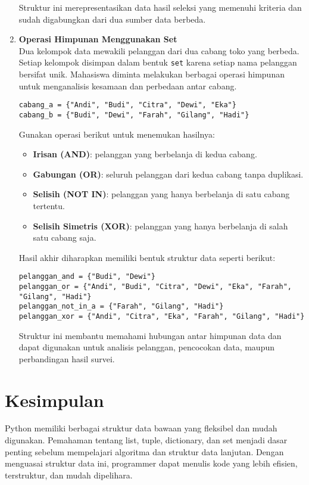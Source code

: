 \begin{enumerate}
Struktur ini merepresentasikan data hasil seleksi yang memenuhi kriteria dan sudah digabungkan dari dua sumber data berbeda.


\item \textbf{Operasi Himpunan Menggunakan Set} \\
Dua kelompok data mewakili pelanggan dari dua cabang toko yang berbeda. 
Setiap kelompok disimpan dalam bentuk \texttt{set} karena setiap nama pelanggan bersifat unik.  
Mahasiswa diminta melakukan berbagai operasi himpunan untuk menganalisis kesamaan dan perbedaan antar cabang.

\begin{lstlisting}[style=PythonStyle]
cabang_a = {"Andi", "Budi", "Citra", "Dewi", "Eka"}
cabang_b = {"Budi", "Dewi", "Farah", "Gilang", "Hadi"}
\end{lstlisting}

Gunakan operasi berikut untuk menemukan hasilnya:
\begin{itemize}
  \item \textbf{Irisan (AND)}: pelanggan yang berbelanja di kedua cabang.
  \item \textbf{Gabungan (OR)}: seluruh pelanggan dari kedua cabang tanpa duplikasi.
  \item \textbf{Selisih (NOT IN)}: pelanggan yang hanya berbelanja di satu cabang tertentu.
  \item \textbf{Selisih Simetris (XOR)}: pelanggan yang hanya berbelanja di salah satu cabang saja.
\end{itemize}

Hasil akhir diharapkan memiliki bentuk struktur data seperti berikut:

\begin{lstlisting}[style=PythonStyle]
pelanggan_and = {"Budi", "Dewi"}
pelanggan_or = {"Andi", "Budi", "Citra", "Dewi", "Eka", "Farah", "Gilang", "Hadi"}
pelanggan_not_in_a = {"Farah", "Gilang", "Hadi"}
pelanggan_xor = {"Andi", "Citra", "Eka", "Farah", "Gilang", "Hadi"}
\end{lstlisting}

Struktur ini membantu memahami hubungan antar himpunan data dan dapat digunakan untuk 
analisis pelanggan, pencocokan data, maupun perbandingan hasil survei.

\end{enumerate}

\section{Kesimpulan}
Python memiliki berbagai struktur data bawaan yang fleksibel dan mudah digunakan.
Pemahaman tentang list, tuple, dictionary, dan set menjadi dasar penting sebelum mempelajari algoritma dan struktur data lanjutan.
Dengan menguasai struktur data ini, programmer dapat menulis kode yang lebih efisien, terstruktur, dan mudah dipelihara.
